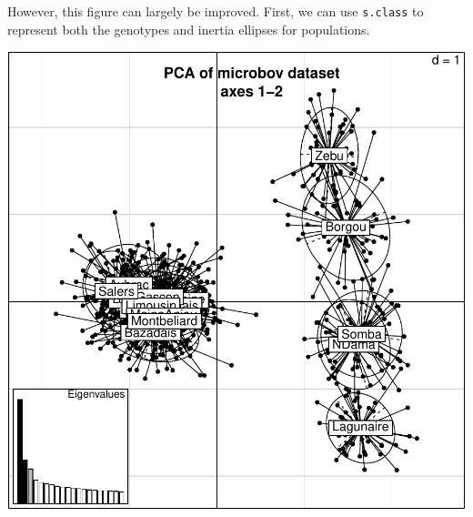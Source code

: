 \documentclass{article}
\begin{document}
However, this figure can largely be improved.
First, we can use \texttt{s.class} to represent both the genotypes and inertia ellipses for populations.
\begin{Schunk}
\end{Schunk}
\includegraphics{figs/base-071}
\end{document}
